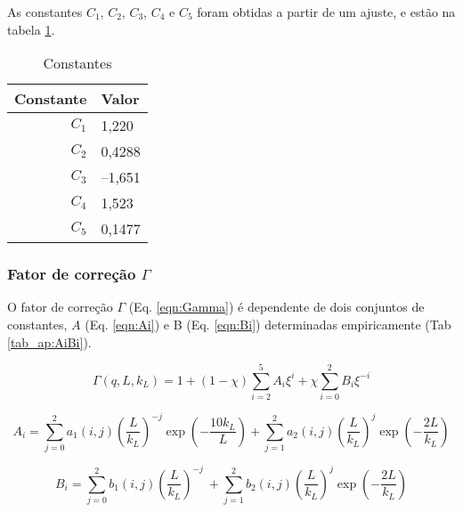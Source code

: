 \begin{apendicesenv}
	As constantes $C_1$, $C_2$, $C_3$, $C_4$ e $C_5$ foram obtidas a partir de um ajuste, e estão na tabela \ref{tab_ap:C1C5}.
	\begin{table}
        \IBGEtab%
        {\caption{Constantes}
        \label{tab_ap:C1C5} }%
        {\begin{tabular}{r p{6cm}}
          \toprule
          Constante 	& Valor \\
          \midrule
          $C_1$			&  1,220	\\
          $C_2$			&  0,4288	\\
          $C_3$			&  --1,651	\\
          $C_4$			&  1,523	\\
          $C_5$			&  0,1477 	\\						
          \bottomrule
        \end{tabular}}%
        {}%
    \end{table}
   
	
	\subsubsection{Fator de correção $\Gamma$}
	
	O fator de correção $\Gamma$ (Eq. \ref{eqn:Gamma}) é dependente de dois conjuntos de constantes, $A$ (Eq. \ref{eqn:Ai}) e B (Eq. \ref{eqn:Bi}) determinadas empiricamente (Tab \ref{tab_ap:AiBi}).
	
	\begin{equation}
	\Gamma\left( q,L,k_{L} \right) = 1 + \left( 1 - \chi \right)\sum_{i = 2}^{5}{A_{i}\xi^{i}} + \chi\sum_{i = 0}^{2}{B_{i}\xi^{- i}}
	\label{eqn:Gamma}
	\end{equation}
	
	\begin{equation}
	A_{i} = \sum_{j = 0}^{2}{a_{1}\left( i,j \right)\left( \frac{L}{k_{L}} \right)^{- j}\exp\left( - \frac{10k_{L}}{L} \right)} + \sum_{j = 1}^{2}{a_{2}\left( i,j \right)\left( \frac{L}{k_{L}} \right)^{j}\exp\left( - \frac{2L}{k_{L}} \right)}
	\label{eqn:Ai}
	\end{equation}
	
	\begin{equation}
	B_{i} = \sum_{j = 0}^{2}{b_{1}\left( i,j \right)\left( \frac{L}{k_{L}} \right)^{- j}\ } + \sum_{j = 1}^{2}{b_{2}\left( i,j \right)\left( \frac{L}{k_{L}} \right)^{j}\exp\left( - \frac{2L}{k_{L}} \right)}
	\label{eqn:Bi}
	\end{equation}
	

\end{apendicesenv}
